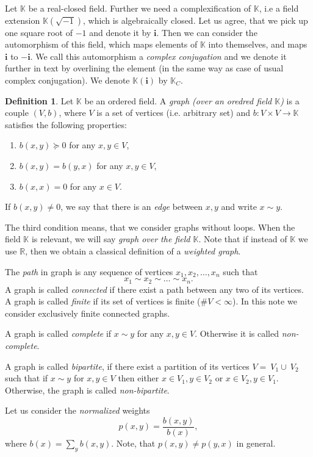 \documentclass[a4paper,12pt]{amsart}
\theoremstyle{definition}
\newtheorem{definition}{Definition}
\newcommand{\K}{\mathbb{K}}
\newcommand{\weight}{b}
\begin{document}
Let $\K$ be a real-closed field. Further we need a complexification of $\K$, i.e a field extension $\K(\sqrt{-1})$, which is algebraically closed. Let us agree, that we pick up one square root of  $-1$ and denote it by $\mathbf i$. Then we can consider the automorphism of this field, which maps elements of $\K$ into themselves, and maps $\mathbf i$ to $-\mathbf i$. We call this automorphism a \emph{complex conjugation} and we denote it further in text by overlining the element (in the same way as case of usual complex conjugation). We denote $\K(\mathbf i)$ by $\K_C$.
\begin{definition}\cite{Muranova1}
Let $\K$ be an ordered field. A \emph{graph (over an oredred field $\K$)} is a couple $(V, b)$, where $V$ is a set of vertices (i.e. arbitrary set)
and $\weight:V\times V\rightarrow \K$ satisfies the following properties:
\begin{enumerate}
\item
$\weight (x,y)\succeq 0$ for any $x,y\in V$,
\item
$\weight (x,y)=\weight (y,x)$ for any $x,y\in V$,
\item
$\weight (x,x)= 0$ for any $x\in V$.
\end{enumerate}
If $\weight (x,y)\ne 0$, we say that there is an \emph{edge} between $x,y$ and write $x\sim y$. 
\end{definition}
The third condition means, that we consider graphs without loops.
When the field $\K$ is relevant, we will say \emph{graph over the field $\K$}.
Note that if instead of $\K$ we use $\mathbb R$, then we obtain a classical definition of a \emph{weighted graph}.




The \emph{path} in graph is any sequence of vertices $x_1,x_2,\dots,x_n$ such that 
$$
x_1\sim x_2\sim\dots \sim x_n.
$$
A graph is called \emph{connected} if there exist a path between any two of its vertices. A graph is called \emph{finite} if its set of vertices is finite ($\#V<\infty$).
In this note we consider exclusively finite connected graphs.


A graph is called \emph{complete} if $x\sim y$ for any $x,y\in V$. Otherwise it is called \emph{non-complete}.


A graph is called \emph{bipartite}, if there exist a partition of its vertices $V=~V_1\cup ~V_2$ such that if $x\sim y$ for $x,y\in V$ then either $x\in V_1, y\in V_2$ or $x\in V_2, y\in V_1$. Otherwise, the graph is called \emph{non-bipartite}.


Let us consider the \emph{normalized} weights 
\begin{equation}
p(x,y)=\dfrac{\weight (x,y)}{\weight (x)},
\end{equation}
where $\weight (x)=\sum_y \weight (x,y)$. Note, that $p(x,y)\ne p(y,x)$ in general.
\end{document}
